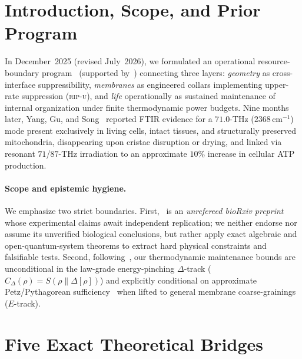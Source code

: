 \documentclass[10pt,twocolumn]{article}
\begin{document}
\begin{abstract}
while an $S$-lamella coupled cristae stack outperforms factorized single-bilayer water-band shielding whenever $C_S(\delta+\beta)+r < 1$; and (v)~we deliver a four-test experimental falsification matrix separating classical artifacts, Regime~I, and Regime~II.
\end{abstract}

\section{Introduction, Scope, and Prior Program}
In December~2025 (revised July~2026), we formulated an operational resource-boundary program~\cite{Eriksson2025GeometryMembranes} (supported by~\cite{Eriksson2025MaintenanceWork,Eriksson2026RipUOmegaZero,Eriksson2026MaintenanceNotRestoration,Eriksson2026ManyBodyFilling,Eriksson2026PassiveNetworks}) connecting three layers: \emph{geometry} as cross-interface suppressibility, \emph{membranes} as engineered collars implementing upper-rate suppression (\textsc{rip-u}), and \emph{life} operationally as sustained maintenance of internal organization under finite thermodynamic power budgets. Nine months later, Yang, Gu, and Song~\cite{YangGuSong2026Mito} reported FTIR evidence for a $71.0$-THz ($2368\,\mathrm{cm}^{-1}$) mode present exclusively in living cells, intact tissues, and structurally preserved mitochondria, disappearing upon cristae disruption or drying, and linked via resonant $71$/$87$-THz irradiation to an approximate $10\%$ increase in cellular ATP production.

\paragraph{Scope and epistemic hygiene.}
We emphasize two strict boundaries. First,~\cite{YangGuSong2026Mito} is an \emph{unrefereed bioRxiv preprint} whose experimental claims await independent replication; we neither endorse nor assume its unverified biological conclusions, but rather apply exact algebraic and open-quantum-system theorems to extract hard physical constraints and falsifiable tests. Second, following~\cite{Eriksson2025GeometryMembranes}, our thermodynamic maintenance bounds are unconditional in the law-grade energy-pinching $\Delta$-track ($C_\Delta(\rho) = S(\rho\|\Delta[\rho])$) and explicitly conditional on approximate Petz/Pythagorean sufficiency~\cite{FawziRenner2015CMI} when lifted to general membrane coarse-grainings ($E$-track).

\section{Five Exact Theoretical Bridges}
\end{document}
